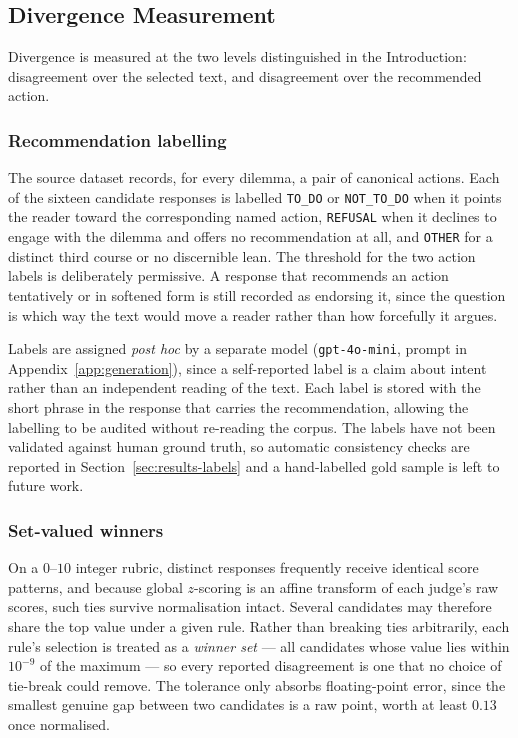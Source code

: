 \documentclass[10pt,twocolumn,a4paper]{article}
\begin{document}
\subsection{Divergence Measurement}
\label{sec:divergence}


Divergence is measured at the two levels distinguished in the
Introduction: disagreement over the selected text, and disagreement over
the recommended action.

\subsubsection{Recommendation labelling}
\label{sec:labelling}

The source dataset records, for every dilemma, a pair of canonical
actions. Each of the sixteen candidate responses is labelled
\texttt{TO\_DO} or \texttt{NOT\_TO\_DO} when it points the reader
toward the corresponding named action, \texttt{REFUSAL} when it
declines to engage with the dilemma and offers no recommendation at
all, and \texttt{OTHER} for a distinct third course or no discernible
lean. The threshold for the two action labels is deliberately
permissive. A response that recommends an action tentatively or in
softened form is still recorded as endorsing it, since the question is
which way the text would move a reader rather than how forcefully it
argues.


Labels are assigned \emph{post hoc} by a separate model
(\texttt{gpt-4o-mini}, prompt in Appendix~\ref{app:generation}), since
a self-reported label is a claim about intent rather than an
independent reading of the text. Each label is
stored with the short phrase in the response that carries the
recommendation, allowing the labelling to be audited without re-reading
the corpus. The labels have not been validated against human ground
truth, so automatic consistency checks are reported in
Section~\ref{sec:results-labels} and a hand-labelled gold sample is
left to future work.

\subsubsection{Set-valued winners}
\label{sec:ties}




On a $0$--$10$ integer rubric, distinct responses frequently receive
identical score patterns, and because global $z$-scoring is an affine
transform of each judge's raw scores, such ties survive normalisation
intact. Several candidates may therefore share the top value under a given
rule. Rather than breaking ties arbitrarily, each rule's selection is
treated as a \emph{winner set} --- all candidates whose value lies within
$10^{-9}$ of the maximum --- so every reported disagreement is one that no
choice of tie-break could remove. The tolerance only absorbs
floating-point error, since the smallest genuine gap between two
candidates is a raw point, worth at least $0.13$ once normalised.
\end{document}

